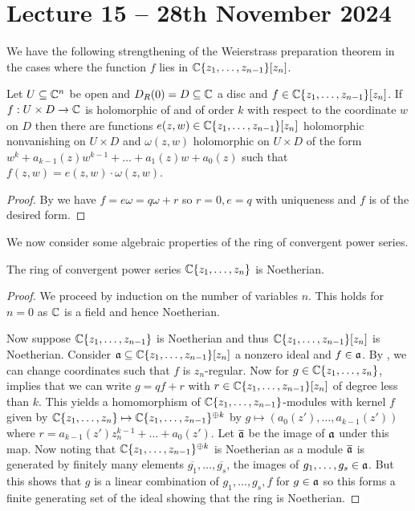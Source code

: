 \section{Lecture 15 -- 28th November 2024}\label{sec: lecture 15}
We have the following strengthening of the Weierstrass preparation theorem in the cases where the function $f$ lies in $\mathbb{C}\{z_{1},\dots,z_{n-1}\}[z_{n}]$. 
\begin{proposition}\label{prop: Weierstrass preparation for univariate over convergent power series}
    Let $U\subseteq\mathbb{C}^{n}$ be open and $D_{R}(0)=D\subseteq\mathbb{C}$ a disc and $f\in\mathbb{C}\{z_{1},\dots,z_{n-1}\}[z_{n}]$. If $f:U\times D\to\mathbb{C}$ is holomorphic of and of order $k$ with respect to the coordinate $w$ on $D$ then there are functions $e(z,w)\in\mathbb{C}\{z_{1},\dots,z_{n-1}\}[z_{n}]$ holomorphic nonvanishing on $U\times D$ and $\omega(z,w)$ holomorphic on $U\times D$ of the form $w^{k}+a_{k-1}(z)w^{k-1}+\dots+a_{1}(z)w+a_{0}(z)$ such that $f(z,w)=e(z,w)\cdot\omega(z,w)$.
\end{proposition}
\begin{proof}
    By  we have $f=e\omega=q\omega+r$ so $r=0,e=q$ with uniqueness and $f$ is of the desired form.  
\end{proof}
We now consider some algebraic properties of the ring of convergent power series. 
\begin{theorem}\label{thm: convergent power series is Noetherian}
    The ring of convergent power series $\mathbb{C}\{z_{1},\dots,z_{n}\}$ is Noetherian. 
\end{theorem}
\begin{proof}
    We proceed by induction on the number of variables $n$. This holds for $n=0$ as $\mathbb{C}$ is a field and hence Noetherian. 

    Now suppose $\mathbb{C}\{z_{1},\dots,z_{n-1}\}$ is Noetherian and thus $\mathbb{C}\{z_{1},\dots,z_{n-1}\}[z_{n}]$ is Noetherian. Consider $\mathfrak{a}\subseteq\mathbb{C}\{z_{1},\dots,z_{n-1}\}[z_{n}]$ a nonzero ideal and $f\in\mathfrak{a}$. By , we can change coordinates such that $f$ is $z_{n}$-regular. Now for $g\in\mathbb{C}\{z_{1},\dots,z_{n}\}$,  implies that we can write $g=qf+r$ with $r\in\mathbb{C}\{z_{1},\dots,z_{n-1}\}[z_{n}]$ of degree less than $k$. This yields a homomorphism of $\mathbb{C}\{z_{1},\dots,z_{n-1}\}$-modules with kernel $f$ given by $\mathbb{C}\{z_{1},\dots,z_{n}\}\mapsto\mathbb{C}\{z_{1},\dots,z_{n-1}\}^{\oplus k}$ by $g\mapsto(a_{0}(z'),\dots,a_{k-1}(z'))$ where $r=a_{k-1}(z')z_{n}^{k-1}+\dots+a_{0}(z')$. Let $\overline{\mathfrak{a}}$ be the image of $\mathfrak{a}$ under this map. Now noting that $\mathbb{C}\{z_{1},\dots,z_{n-1}\}^{\oplus k}$ is Noetherian as a module $\overline{\mathfrak{a}}$ is generated by finitely many elements $\overline{g_{1}},\dots,\overline{g_{s}}$, the images of $g_{1},\dots,g_{s}\in\mathfrak{a}$. But this shows that $g$ is a linear combination of $g_{1},\dots,g_{s},f$ for $g\in\mathfrak{a}$ so this forms a finite generating set of the ideal showing that the ring is Noetherian. 
\end{proof}
